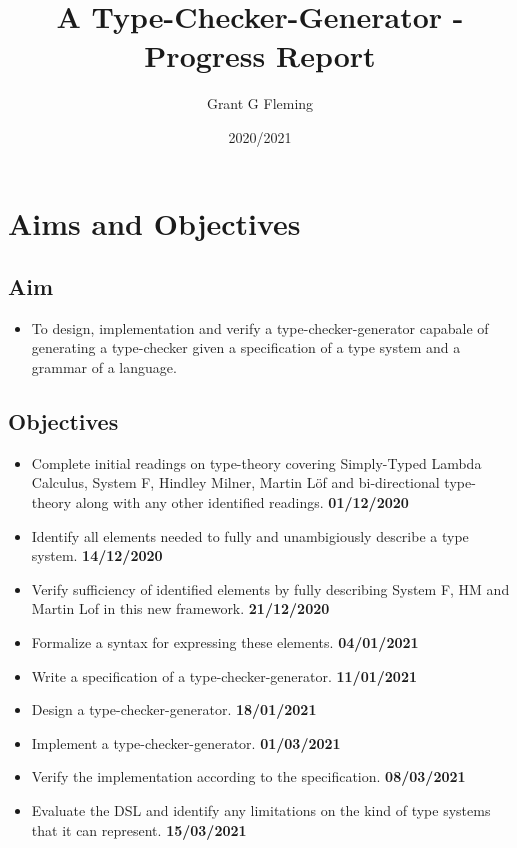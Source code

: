 \documentclass{FinalYearReport}[2020/09/15]
\title{A Type-Checker-Generator - Progress Report}
\author{Grant G Fleming}
\date{2020/2021}
\begin{document}
	\maketitle
	\tableofcontents
        
        \chapter{Aims and Objectives}

        \section{Aim}

        \begin{itemize}
          \item To design, implementation and verify a
            type-checker-generator capabale of generating a
            type-checker given a specification of a type system and a
            grammar of a language. 
        \end{itemize}
        
        \section{Objectives}

        \begin{itemize}
          \item Complete initial readings on type-theory covering
            Simply-Typed Lambda Calculus, System F, Hindley Milner,
            Martin L\"{o}f and bi-directional type-theory along with
            any other identified readings. \textbf{01/12/2020}
          \item Identify all elements needed to fully and
            unambigiously describe a type system. \textbf{14/12/2020} 
          \item Verify sufficiency of identified elements by fully describing
            System F, HM and Martin Lof in this new framework. \textbf{21/12/2020}
          \item Formalize a syntax for expressing these elements. \textbf{04/01/2021}
          \item Write a specification of a type-checker-generator. \textbf{11/01/2021}
          \item Design a type-checker-generator. \textbf{18/01/2021} 
          \item Implement a type-checker-generator. \textbf{01/03/2021}
          \item Verify the implementation according to the
            specification. \textbf{08/03/2021}
          \item Evaluate the DSL and identify any limitations on the
            kind of type systems that it can represent. \textbf{15/03/2021}
        \end{itemize}
        
\end{document}
